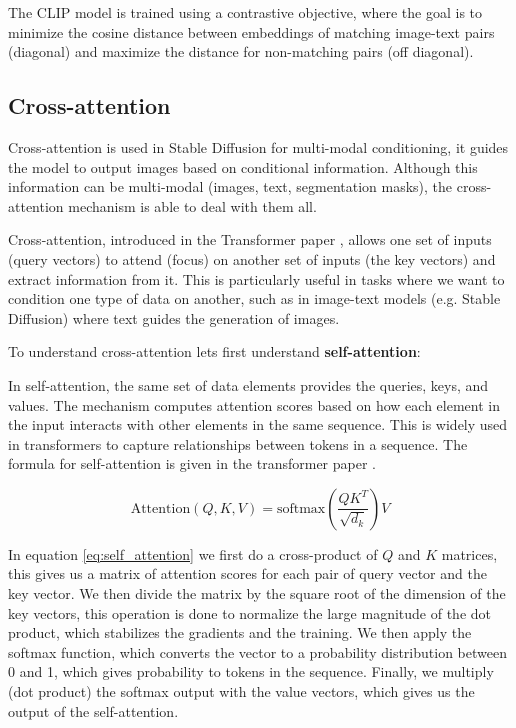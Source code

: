 The CLIP model is trained using a contrastive objective, where the goal is to minimize the cosine distance between embeddings of matching image-text pairs (diagonal) and maximize the distance for non-matching pairs (off diagonal).






\subsection{Cross-attention}

Cross-attention is used in Stable Diffusion for multi-modal conditioning, it guides the model to output images based on conditional information. Although this information can be multi-modal (images, text, segmentation masks), the cross-attention mechanism is able to deal with them all.

Cross-attention, introduced in the Transformer paper \cite{transformer}, allows one set of inputs (query vectors) to attend (focus) on another set of inputs (the key vectors) and extract information from it. This is particularly useful in tasks where we want to condition one type of data on another, such as in image-text models (e.g. Stable Diffusion) where text guides the generation of images.

To understand cross-attention lets first understand \textbf{self-attention}:

In self-attention, the same set of data elements provides the queries, keys, and values. The mechanism computes attention scores based on how each element in the input interacts with other elements in the same sequence. This is widely used in transformers to capture relationships between tokens in a sequence. The formula for self-attention is given in the transformer paper \cite{transformer}.

\begin{equation}
    \text{Attention}(Q, K, V) = \text{softmax} \left( \frac{QK^T}{\sqrt{d_k}} \right) V
    \label{eq:self_attention}
\end{equation}

In equation \ref{eq:self_attention} we first do a cross-product of $Q$ and $K$ matrices, this gives us a matrix of attention scores for each pair of query vector and the key vector. We then divide the matrix by the square root of the dimension of the key vectors, this operation is done to normalize the large magnitude of the dot product, which stabilizes the gradients and the training. We then apply the softmax function, which converts the vector to a probability distribution between 0 and 1, which gives probability to tokens in the sequence. Finally, we multiply (dot product) the softmax output with the value vectors, which gives us the output of the self-attention.

